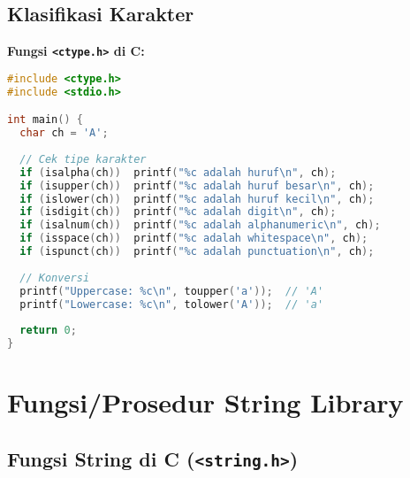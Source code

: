 \documentclass[../main.tex]{subfiles}
\begin{document}
\subsection{Klasifikasi Karakter}

\textbf{Fungsi \texttt{<ctype.h>} di C:}
\begin{lstlisting}[language=C, caption={Klasifikasi karakter di C}]
#include <ctype.h>
#include <stdio.h>

int main() {
  char ch = 'A';
  
  // Cek tipe karakter
  if (isalpha(ch))  printf("%c adalah huruf\n", ch);
  if (isupper(ch))  printf("%c adalah huruf besar\n", ch);
  if (islower(ch))  printf("%c adalah huruf kecil\n", ch);
  if (isdigit(ch))  printf("%c adalah digit\n", ch);
  if (isalnum(ch))  printf("%c adalah alphanumeric\n", ch);
  if (isspace(ch))  printf("%c adalah whitespace\n", ch);
  if (ispunct(ch))  printf("%c adalah punctuation\n", ch);
  
  // Konversi
  printf("Uppercase: %c\n", toupper('a'));  // 'A'
  printf("Lowercase: %c\n", tolower('A'));  // 'a'
  
  return 0;
}
\end{lstlisting}

\section{Fungsi/Prosedur String Library}

\subsection{Fungsi String di C (\texttt{<string.h>})}
\end{document}
